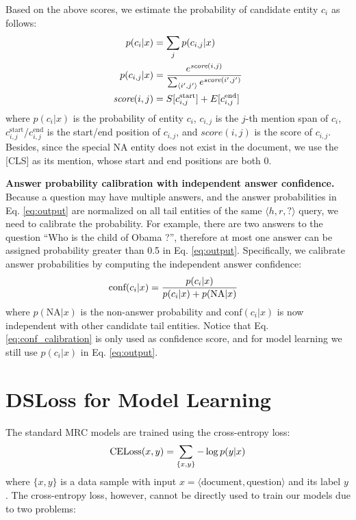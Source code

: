 \documentclass[11pt,a4paper]{article}
\begin{document}
  Based on the above scores, we estimate the probability of candidate entity $c_i$ as follows:
  \begin{align}
    \setlength{\abovedisplayskip}{0pt}
    \setlength{\belowdisplayskip}{-1pt}
    p(c_{i}|x) &= \sum_j p(c_{i,j}|x)\label{eq:output}\\
    p(c_{i,j}|x) &= \frac{e^{\textit{score}(i,j)}}{\sum_{\langle i',j'\rangle} e^{\textit{score}(i',j')}} \label{eq:span_output}\\
    \textit{score}(i,j) &= S[c_{i,j}^{\text{start}}] + E[c_{i,j}^{\text{end}}]\label{eq:score}
  \end{align}
  \noindent where $p(c_i|x)$ is the probability of entity $c_i$, $c_{i,j}$ is the $j$-th mention span of $c_i$, $c_{i,j}^{\text{start}}$/$c_{i,j}^{\text{end}}$ is the start/end position of $c_{i,j}$, and $\textit{score}(i,j)$ is the score of $c_{i,j}$.
  Besides, since the special NA entity does not exist in the document, we use the [CLS] as its mention, whose start and end positions are both 0.
  
  \textbf{Answer probability calibration with independent answer confidence.}
  Because a question may have multiple answers, and the answer probabilities in Eq. \ref{eq:output} are normalized on all tail entities of the same $\langle h, r, ?\rangle$ query, we need to calibrate the probability.
  For example, there are two answers to the question ``Who is the child of Obama ?'', therefore at most one answer can be assigned probability greater than 0.5 in Eq. \ref{eq:output}.
  Specifically, we calibrate answer probabilities by computing the independent answer confidence:
  \begin{equation}
    \setlength{\abovedisplayskip}{4pt}
    \setlength{\belowdisplayskip}{4pt}
    \begin{aligned}
    \text{conf}(c_i|x) &= \frac{p(c_{i}|x)}{p(c_{i}|x)+ p(\text{NA}|x)}
    \end{aligned}
  \label{eq:conf_calibration}
  \end{equation}
  \noindent where $p(\text{NA}|x)$ is the non-answer probability and $\text{conf}(c_i|x)$ is now independent with other candidate tail entities.
  Notice that Eq. \ref{eq:conf_calibration} is only used as confidence score, and for model learning we still use $p(c_i|x)$ in Eq. \ref{eq:output}.
  
  \section{DSLoss for Model Learning}
  The standard MRC models are trained using the cross-entropy loss:
  \begin{equation}
    \setlength{\abovedisplayskip}{5pt}
    \setlength{\belowdisplayskip}{5pt}
    {\rm CELoss}(x,y) = \sum_{\{x, y\}} - \log p(y|x)
  \end{equation}
  \noindent where $\{x, y\}$ is a data sample with input $x=\langle \text{document}, \text{question} \rangle$ and its label $y$.
  The cross-entropy loss, however, cannot be directly used to train our models due to two problems:
  
\end{document}
